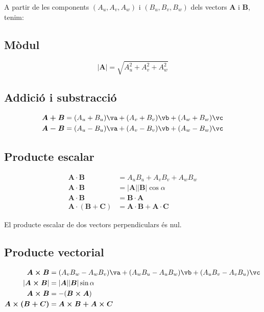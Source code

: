 \documentclass[catalan,a4paper,twoside,11pt]{article}
\begin{document}
A partir de les components $(A_u,A_v,A_w)$ i $(B_u,B_v,B_w)$
dels vectors $\boldsymbol{A}$ i $\boldsymbol{B}$, tenim:

\subsection{M\`{o}dul}
\vspace{-5mm}
\begin{equation}
    |\boldsymbol{A}|=  \sqrt{A_u^2 + A_v^2 + A_w^2}
\end{equation}

\subsection{Addici\'{o} i substracci\'{o}}
\vspace{-5mm}
\begin{subequations}\begin{align}
    \boldsymbol{A+B}= (A_u+B_u)\va + (A_v+B_v)\vb + (A_w+B_w)\vc \\
    \boldsymbol{A-B}= (A_u-B_u)\va + (A_v-B_v)\vb + (A_w-B_w)\vc
\end{align}\end{subequations}

\subsection{Producte escalar}
\vspace{-5mm}
\begin{align}
    \boldsymbol{A\cdot B} &= A_u B_u + A_v B_v + A_w B_w\\
    \boldsymbol{A\cdot B} &=|\boldsymbol{A}| |\boldsymbol{B}| \cos\alpha\\
    \boldsymbol{A\cdot B} &=\boldsymbol{B\cdot A}\\
    \boldsymbol{A\cdot(B+C)} &= \boldsymbol{A\cdot B+ A\cdot C}
\end{align}

El producte escalar de dos vectors perpendiculars  \'{e}s nul.

\subsection{Producte vectorial}
\vspace{-5mm}
\begin{align}
    \boldsymbol{A\times B} &= (A_v B_w - A_w B_v)\va + (A_w B_u - A_u B_w)\vb +
    (A_u B_v - A_v B_u)\vc \\
    |\boldsymbol{A\times B}| &=|\boldsymbol{A}| |\boldsymbol{B}| \sin\alpha\\
    \boldsymbol{A\times B} &=-(\boldsymbol{B\times A})\\
    \boldsymbol{A\times(B+C)} &= \boldsymbol{A\times B+ A\times C}
\end{align}
\end{document}
